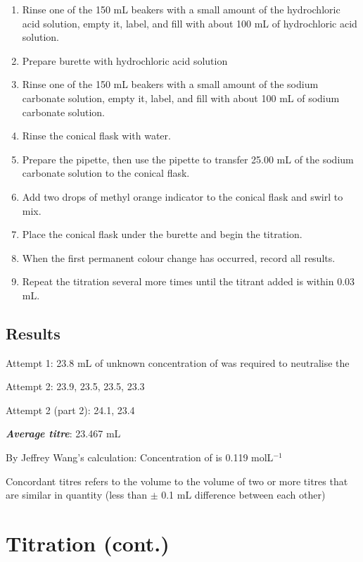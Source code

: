 		\begin{enumerate}
			\item Rinse one of the 150 mL beakers with a small amount of the hydrochloric acid solution, empty it, label, and fill with about 100 mL of hydrochloric acid solution.
			\item Prepare burette with hydrochloric acid solution
			\item Rinse one of the 150 mL beakers with a small amount of the sodium carbonate solution, empty it, label, and fill with about 100 mL of sodium carbonate solution.
			\item Rinse the conical flask with water.
			\item Prepare the pipette, then use the pipette to transfer 25.00 mL of the sodium carbonate solution to the conical flask.

			\item Add two drops of methyl orange indicator to the conical flask and swirl to mix. 
			\item Place the conical flask under the burette and begin the titration. 
			\item When the first permanent colour change has occurred, record all results. 
			\item Repeat the titration several more times until the titrant added is within 0.03 mL.
		\end{enumerate}

	\subsection{Results}
	
		Attempt 1: 23.8 mL of unknown concentration of  was required to neutralise the 

		Attempt 2: 23.9, 23.5, 23.5, 23.3
		
		Attempt 2 (part 2): 24.1, 23.4

		\textbf{\textit{Average titre}}: 23.467 mL

		By Jeffrey Wang's calculation: Concentration of  is 0.119 molL$^{-1}$
		
		Concordant titres refers to the volume to the volume of two or more titres that are similar in quantity (less than $\pm$ 0.1 mL difference between each other)

\section{Titration (cont.)}

